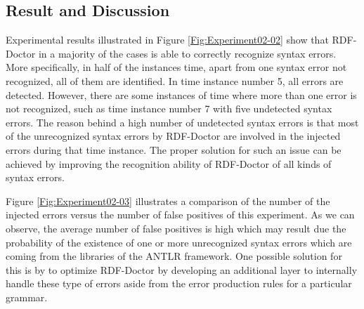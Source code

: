 \subsection{Result and Discussion}

Experimental results illustrated in Figure \ref{Fig:Experiment02-02} show that RDF-Doctor in a majority of the cases is able to correctly recognize syntax errors. 
More specifically, in half of the instances time, apart from one syntax error not recognized, all of them are identified.
In time instance number 5, all errors are detected.
However, there are some instances of time where more than one error is not recognized, such as time instance number 7 with five undetected syntax errors.
The reason behind a high number of undetected syntax errors is that most of the unrecognized syntax errors by RDF-Doctor are involved in the injected errors during that time instance. The proper solution for such an issue can be achieved by improving the recognition ability of RDF-Doctor of all kinds of syntax errors.


Figure \ref{Fig:Experiment02-03} illustrates a comparison of the number of the injected errors versus the number of false positives of this experiment. 
As we can observe, the average number of false positives is high which may result due the probability of the existence of one or more unrecognized syntax errors which are coming from the libraries of the ANTLR framework. 
One possible solution for this is by to optimize RDF-Doctor by developing an additional layer to internally handle these type of errors aside from  the error production rules for a particular grammar.


